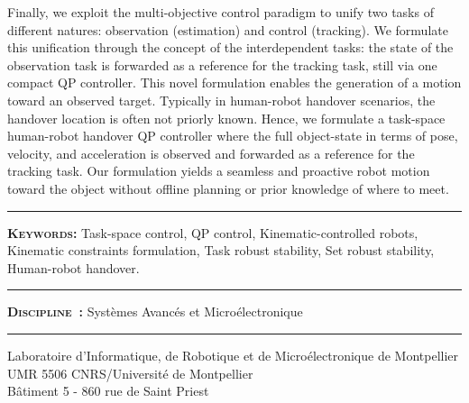 \noindent
Finally, we exploit the multi-objective control paradigm to unify two tasks of different natures: observation (estimation) and control (tracking). We formulate this unification through the concept of the interdependent tasks: the state of the observation task is forwarded as a reference for the tracking task, still via one compact QP controller. This novel formulation enables the generation of a motion toward an observed target. Typically in human-robot handover scenarios, the handover location is often not priorly known. Hence, we formulate a task-space human-robot handover QP controller where the full object-state in terms of pose, velocity, and acceleration is observed and forwarded as a reference for the tracking task. Our formulation yields a seamless and proactive robot motion toward the object without offline planning or prior knowledge of where to meet.


\vspace{3pt}\hrule\vspace{3pt}
\noindent 
\textbf{\textsc{Keywords:}}
Task-space control, QP control, Kinematic-controlled robots, Kinematic constraints formulation, Task robust stability, Set robust stability, Human-robot handover.
\noindent \vspace{3pt}\hrule\vspace{3pt}
\noindent \textbf{\textsc{Discipline~:}}
Syst\`emes Avanc\'es et Micro\'electronique
\noindent \vspace{3pt}\hrule\vspace{3pt}
\noindent Laboratoire d'Informatique, de Robotique et de Micro\'electronique de Montpellier\\
UMR 5506 CNRS/Universit\'e de Montpellier\\
B\^atiment 5 - 860 rue de Saint Priest

